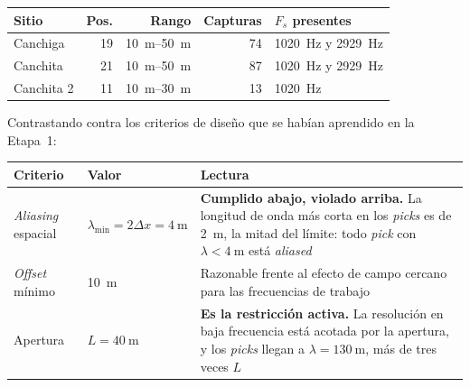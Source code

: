 
\begin{center}\small
\begin{tabularx}{\textwidth}{@{}l r r r X@{}}
\toprule
\textbf{Sitio} & \textbf{Pos.} & \textbf{Rango} & \textbf{Capturas} & \textbf{$F_s$ presentes} \\
\midrule
Canchiga    & 19 & \SIrange{10}{50}{\meter} & 74 & \SI{1020}{\hertz} y \SI{2929}{\hertz} \\
Canchita    & 21 & \SIrange{10}{50}{\meter} & 87 & \SI{1020}{\hertz} y \SI{2929}{\hertz} \\
Canchita 2  & 11 & \SIrange{10}{30}{\meter} & 13 & \SI{1020}{\hertz} \\
\bottomrule
\end{tabularx}
\end{center}


Contrastando contra los criterios de dise\~no que se hab\'ian aprendido en la
Etapa~1:

\begin{center}\small
\begin{tabularx}{\textwidth}{@{}l l X@{}}
\toprule
\textbf{Criterio} & \textbf{Valor} & \textbf{Lectura} \\
\midrule
\emph{Aliasing} espacial & $\lambda_{\min} = 2\Delta x = \SI{4}{\meter}$ &
\textbf{Cumplido abajo, violado arriba.} La longitud de onda m\'as corta en los
\emph{picks} es de \SI{2}{\meter}, la mitad del l\'imite: todo \emph{pick} con
$\lambda < \SI{4}{\meter}$ est\'a \emph{aliased} \\
\addlinespace[2pt]
\emph{Offset} m\'inimo & \SI{10}{\meter} &
Razonable frente al efecto de campo cercano para las frecuencias de trabajo \\
\addlinespace[2pt]
Apertura & $L = \SI{40}{\meter}$ &
\textbf{Es la restricci\'on activa.} La resoluci\'on en baja frecuencia est\'a
acotada por la apertura, y los \emph{picks} llegan a
$\lambda = \SI{130}{\meter}$, m\'as de tres veces $L$ \\
\bottomrule
\end{tabularx}
\end{center}

